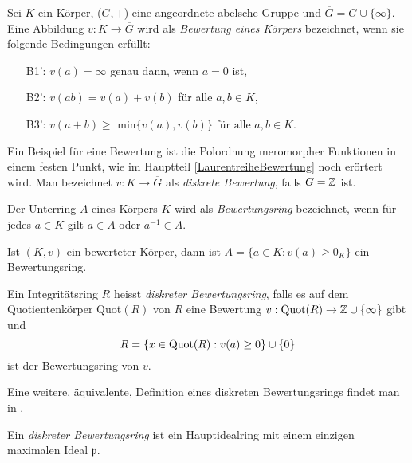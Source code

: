 \begin{defn}  \label{bewKoerper} %
Sei $K$ ein Körper, ($G, +$) eine angeordnete abelsche Gruppe und $\overline{G}  = G \cup \lbrace\infty\rbrace $. Eine Abbildung $v\colon K \to \overline{G} $ wird als \textit{Bewertung eines Körpers} bezeichnet, wenn sie folgende Bedingungen erfüllt:
\begin{enumerate}
\item[B1':] $v(a) = \infty$ genau dann, wenn $a = 0$ ist,
\item[B2':] $v(ab) = v\left(a\right)+v\left(b\right) $ für alle $ a, b \in K$,
\item[B3':] $v\left(a+b\right) \ge $ min$\lbrace v(a),v\left(b \right)\rbrace \text{ für alle }  a, b \in K. $
\end{enumerate}
\end{defn}
Ein Beispiel für eine Bewertung ist die Polordnung meromorpher Funktionen in einem festen Punkt, wie im Hauptteil \ref*{LaurentreiheBewertung} noch erörtert wird. 
Man bezeichnet $v\colon K \to \overline{G} $ als \textit{diskrete Bewertung}, falls ${G} = \mathbb{Z}$ ist.
%
\begin{defn} %
Der Unterring $A$ eines Körpers $K$ wird als \textit{Bewertungsring} bezeichnet, wenn für jedes $a\in K$ gilt $a \in A$ oder $a^{-1}\in A$.
\end{defn}
\begin{bem}
Ist $\left(K, v\right)$ ein bewerteter Körper, dann ist $A = \lbrace a \in K\colon v(a) \geq 0_K\rbrace$ ein Bewertungsring.
\end{bem}
\begin{defn} %
Ein Integritätsring $R$ heisst \textit{diskreter Bewertungsring}, falls es auf dem Quotientenkörper \textup{Quot}$(R)$ von $R$ eine Bewertung $v: \textup{Quot}(R) \rightarrow \mathbb{Z} \cup \lbrace\infty\rbrace$ gibt und 
\[R = \lbrace x \in \textup{Quot}(R): v(a) \ge 0 \rbrace \cup \lbrace 0 \rbrace\]
ist der Bewertungsring von $v$.
\end{defn}
Eine weitere, äquivalente, Definition eines diskreten Bewertungsrings findet man in \cite[S. 126]{neukirch92}.
\begin{defn} %
Ein \textit{diskreter Bewertungsring} ist ein Hauptidealring mit einem einzigen maximalen Ideal $\mathfrak{p}$.
\end{defn} 
%
%
